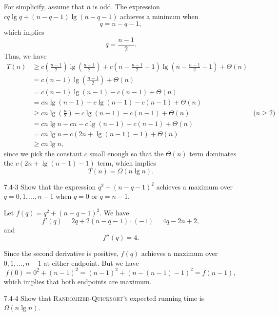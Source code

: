 \begin{enumerate}
\begin{framed}
For simplicify, assume that $n$ is odd. The expression $c q \lg q + (n - q - 1)
\lg (n - q - 1)$ achieves a minimum when
\[
  q = n - q - 1,
\]
which implies
\[
  q = \frac{n - 1}{2}.
\]
Thus, we have
\begin{equation*}
\begin{aligned}
  T(n) &\ge c \left(\frac{n - 1}{2}\right) \lg \left(\frac{n - 1}{2}\right) +
            c\left(n - \frac{n - 1}{2} - 1\right) \lg \left(n - \frac{n - 1}{2} - 1\right) + \Theta(n)\\
       &= c(n - 1) \lg \left(\frac{n - 1}{2}\right) + \Theta(n)\\
       &= c(n - 1) \lg (n - 1) - c(n - 1) + \Theta(n)\\
       &= cn \lg (n - 1) - c \lg (n - 1) - c (n - 1) + \Theta(n)\\
       &\ge cn \lg \left(\frac{n}{2}\right) - c \lg (n - 1) - c(n - 1) + \Theta(n) & \text{($n \ge 2$)}\\
       &= cn \lg n - cn - c \lg (n - 1) - c(n - 1) + \Theta(n)\\
       &= cn \lg n - c (2n + \lg (n - 1) - 1) + \Theta(n)\\
       &\ge cn \lg n,
\end{aligned}
\end{equation*}
since we pick the constant $c$ small enough so that the $\Theta(n)$ term
dominates the $c(2n + \lg (n - 1) - 1)$ term, which implies
\[
  T(n) = \Omega(n \lg n).
\]
\end{framed}

\item[7.4{-}3]{Show that the expression $q^2 + (n - q - 1)^2$ achieves a maximum
over $q = 0, 1, \dots, n - 1$ when $q = 0$ or $q = n - 1$.}

\begin{framed}
Let $f(q) = q^2 + (n - q - 1)^2$. We have
\[
  f'(q) = 2q + 2(n - q - 1) \cdot (-1) = 4q -2n + 2,
\]
and
\[
  f''(q) = 4.
\]

Since the second derivative is positive, $f(q)$ achieves a maximum over $0, 1,
\dots, n - 1$ at either endpoint. But we have
\[
  f(0) = 0^2 + (n - 1)^2 = (n - 1)^2 + (n - (n - 1) - 1)^2 = f(n - 1),
\]
which implies that both endpoints are maximum.
\end{framed}

\item[7.4{-}4]{Show that \textsc{Randomized-Quicksort's} expected running time
is $\Omega(n \lg n)$.}


\end{enumerate}
